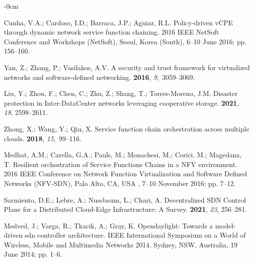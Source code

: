 \documentclass[futureinternet,review,accept,pdftex,moreauthors]{Definitions/mdpi}
\begin{document}
\begin{adjustwidth}{-\extralength}{0cm}
\begin{thebibliography}{999}
Cunha, V.A.; Cardoso, I.D.; Barraca, J.P.; Aguiar, R.L.
\newblock Policy-driven vCPE through dynamic network service function chaining.
  2016 IEEE NetSoft Conference and Workshops (NetSoft), Seoul, Korea (South), 6--10 June 2016;
  pp. 156--160.

Yan, Z.; Zhang, P.; Vasilakos, A.V.
\newblock A security and trust framework for virtualized networks and
  software-defined networking.
 {\bf 2016}, {\em
  9},~3059--3069.

Liu, Y.; Zhou, F.; Chen, C.; Zhu, Z.; Shang, T.; Torres-Moreno, J.M.
\newblock Disaster protection in Inter-DataCenter networks leveraging
  cooperative storage.
 {\bf 2021}, \emph{18}, 2598--2611.

Zhong, X.; Wang, Y.; Qiu, X.
\newblock Service function chain orchestration across multiple clouds.
 {\bf 2018}, {\em 15},~99--116.

Medhat, A.M.; Carella, G.A.; Pauls, M.; Monachesi, M.; Corici, M.; Magedanz, T.
\newblock Resilient orchestration of Service Functions Chains in a NFV
  environment.
  2016 IEEE Conference on Network Function Virtualization and Software
  Defined Networks (NFV-SDN),   Palo Alto, CA, USA ,  7--10 November 2016; pp. 7--12.

Sarmiento, D.E.; Lebre, A.; Nussbaum, L.; Chari, A.
\newblock Decentralized SDN Control Plane for a Distributed Cloud-Edge
  Infrastructure: A Survey.
 {\bf {2021}}, {\em 23}, 256--281.%

Medved, J.; Varga, R.; Tkacik, A.; Gray, K.
\newblock Opendaylight: Towards a model-driven sdn controller architecture.
 IEEE International Symposium on a World of Wireless,
  Mobile and Multimedia Networks 2014,  Sydney, NSW, Australia, 19 June 2014; pp. 1--6.


\end{thebibliography}
\end{adjustwidth}
\end{document}
